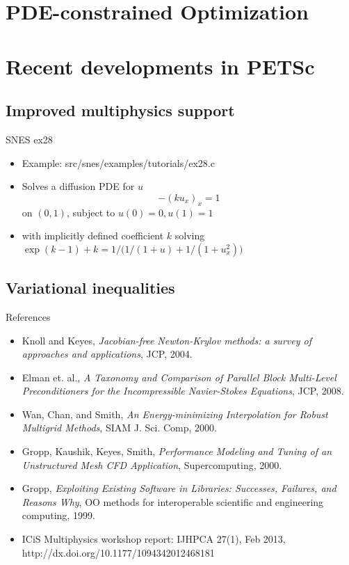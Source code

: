 \documentclass{beamer}
\begin{document}
\section{PDE-constrained Optimization}


\section{Recent developments in PETSc}
\subsection{Improved multiphysics support}







\begin{frame}{SNES ex28}
  \begin{itemize}
  \item Example: {\kb src/snes/examples/tutorials/ex28.c}
  \item Solves a diffusion PDE for $u$
    $$-(k u_x)_x = 1$$
    on $(0,1)$, subject to $u(0) = 0, u(1) = 1$
  \item with implicitly defined coefficient $k$ solving
    $\exp(k-1) + k = 1/\Big(1/(1+u) + 1/(1+u_x^2)\Big)$
  \end{itemize}
\end{frame}
\subsection{Variational inequalities}


\begin{frame}{References}
  \begin{itemize}
  \item Knoll and Keyes, \emph{Jacobian-free Newton-Krylov methods: a survey of approaches and applications}, JCP, 2004.
  \item Elman et. al., \emph{A Taxonomy and Comparison of Parallel Block Multi-Level Preconditioners for the Incompressible Navier-Stokes Equations}, JCP, 2008.
  \item Wan, Chan, and Smith, \emph{An Energy-minimizing Interpolation for Robust Multigrid Methods}, SIAM J. Sci. Comp, 2000.
  \item Gropp, Kaushik, Keyes, Smith, \emph{Performance Modeling and Tuning of an Unstructured Mesh CFD Application}, Supercomputing, 2000.
  \item Gropp, \emph{Exploiting Existing Software in Libraries: Successes, Failures, and Reasons Why}, OO methods for interoperable scientific and engineering computing, 1999.
  \item ICiS Multiphysics workshop report:  IJHPCA 27(1), Feb 2013, http://dx.doi.org/10.1177/1094342012468181
  \end{itemize}
\end{frame}
\end{document}
